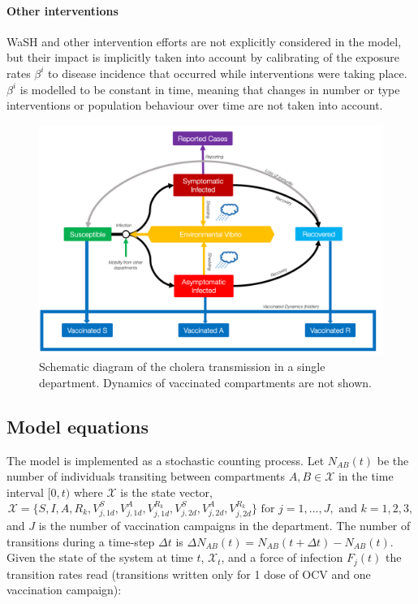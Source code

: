 \paragraph{Other interventions} WaSH and other intervention efforts are not explicitly considered in the model, but their impact is implicitly taken into account by calibrating of the exposure rates $\beta^i$ to disease incidence that occurred while interventions were taking place. $\beta^i$ is modelled to be constant in time, meaning that changes in number or type interventions or population behaviour\cite{Bertuzzo:ProbabilityExtinctionHaiti:2016} over time are not taken into account. %

\begin{figure}[htbp]
\begin{center}
\includegraphics[width=1.0\textwidth]{fig_cholera-haiti-ocv/compartiments.png}
\caption{Schematic diagram of the cholera transmission in a single department. Dynamics of vaccinated compartments are not shown.}
\label{figEPFL}
\end{center}
\end{figure}
\subsection{Model equations}\label{sec:stoch}
The model is implemented as a stochastic counting process\cite{Breto:TimeSeriesAnalysis:2009}. Let \(N_{AB}(t)\) be the number of individuals transiting between compartments \(A,B\in \mathcal{X}\) in the time interval \([0,t)\)  where $\mathcal{X}$ is the state vector,
$$\mathcal{X} = \{S, I, A, R_k, V^S_{j,1d},V^A_{j,1d}, V^{R_k}_{j,1d}, V^S_{j,2d},V^A_{j,2d}, V^{R_k}_{j,2d}\} 
\text{ for } j = 1, ..., J, \text{ and } k = 1, 2, 3,
$$
and $J$ is the number of vaccination campaigns in the department.
The number of transitions during a time-step $\Delta t$ is
\(\Delta N_{AB}(t) = N_{AB}(t+\Delta t) - N_{AB}(t)\). Given the state of the system at time \(t\), \(\mathcal{X}_t\), and a force of infection $F_j(t)$ the transition rates read (transitions written only for 1 dose of OCV and one vaccination campaign):

